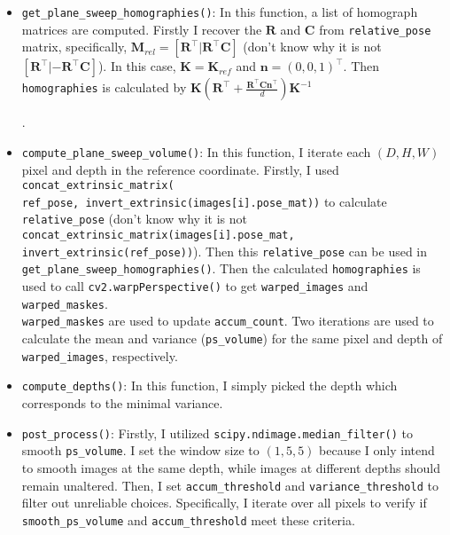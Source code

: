 \begin{itemize}
    \item \texttt{get\_plane\_sweep\_homographies()}: In this function, a list of homograph matrices are computed. Firstly I recover the $\textbf{R}$ and $\textbf{C}$ from \texttt{relative\_pose} matrix, specifically, $\textbf{M}_{rel} = [\textbf{R}^\intercal|\textbf{R}^\intercal \textbf{C}]$ (don't know why it is not $[\textbf{R}^\intercal|-\textbf{R}^\intercal \textbf{C}]$). In this case, $\mathbf{K}=\mathbf{K}_{ref}$ and $\textbf{n}=(0,0,1)^\intercal$. Then \texttt{homographies} is calculated by $\mathbf{K}(\mathbf{R}^\intercal + \frac{\mathbf{R}^\intercal \mathbf{C} \mathbf{n}^\intercal}{d})\mathbf{K}^{-1}$

.
    
    \item \texttt{compute\_plane\_sweep\_volume()}: In this function, I iterate each $(D, H, W)$ pixel and depth in the reference coordinate. Firstly, I used \texttt{concat\_extrinsic\_matrix(\\
    ref\_pose, invert\_extrinsic(images[i].pose\_mat))} to calculate \texttt{relative\_pose} (don't know why it is not \texttt{concat\_extrinsic\_matrix(images[i].pose\_mat, \\
    invert\_extrinsic(ref\_pose))}). Then this \texttt{relative\_pose} can be used in \\
    \texttt{get\_plane\_sweep\_homographies()}. Then the calculated \texttt{homographies} is used to call \texttt{cv2.warpPerspective()} to get \texttt{warped\_images} and \texttt{warped\_maskes}. \\ \texttt{warped\_maskes} are used to update \texttt{accum\_count}. Two iterations are used to calculate the mean and variance (\texttt{ps\_volume}) for the same pixel and depth of \texttt{warped\_images}, respectively.

    \item \texttt{compute\_depths()}: In this function, I simply picked the depth which corresponds to the minimal variance.
    
    \item \texttt{post\_process()}: Firstly, I utilized \texttt{scipy.ndimage.median\_filter()} to smooth \texttt{ps\_volume}. I set the window size to $(1,5,5)$ because I only intend to smooth images at the same depth, while images at different depths should remain unaltered. Then, I set \texttt{accum\_threshold} and \texttt{variance\_threshold} to filter out unreliable choices. Specifically, I iterate over all pixels to verify if \texttt{smooth\_ps\_volume} and \texttt{accum\_threshold} meet these criteria.



\end{itemize}
